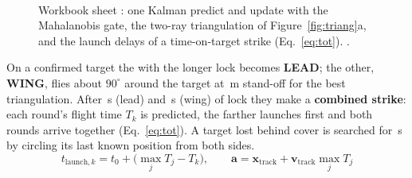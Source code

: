 \begin{figure}[htbp]
\centering
{}\\[1mm]
\\[1mm]
\begin{minipage}[t]{0.3\linewidth}\centering{}\\[1mm]\end{minipage}\hfill
\begin{minipage}[t]{0.68\linewidth}\centering{}\end{minipage}\\[1.5mm]
\begin{minipage}[t]{0.48\linewidth}\centering{}\end{minipage}\hfill
\begin{minipage}[t]{0.48\linewidth}\centering{}\end{minipage}\\[1.5mm]
\\[1mm]
{\footnotesize\wbkey}
\caption{Workbook sheet : one Kalman predict and update with the Mahalanobis gate, the two-ray
triangulation of Figure~\ref{fig:triang}a, and the launch delays of a time-on-target strike (Eq.~\eqref{eq:tot}). .}
\label{fig:wb-tracking}
\end{figure}

On a confirmed target the  with the longer lock becomes \textbf{LEAD}; the other, \textbf{WING}, flies about
$90^\circ$ around the target at \,m stand-off for the best triangulation. After \,s
(lead) and \,s (wing) of lock they make a \textbf{combined strike}: each round's flight time $T_k$ is
predicted, the farther  launches first and both rounds arrive together (Eq.~\eqref{eq:tot}). A target lost behind
cover is searched for \,s by circling its last known position from both sides.
\begin{equation}
t_{\mathrm{launch},k}=t_0+\big(\max_j T_j-T_k\big),\qquad
\mathbf{a}=\mathbf{x}_{\mathrm{track}}+\mathbf{v}_{\mathrm{track}}\max_j T_j
\label{eq:tot}
\end{equation}

\begin{table}[htbp]
\caption{Predicted round flight time against distance.}\label{tab:flight}
\centering\footnotesize\setlength{\tabcolsep}{3.5pt}
\flighttimetable
\end{table}


